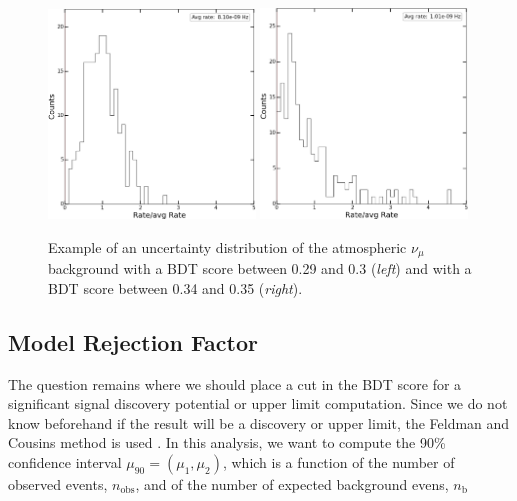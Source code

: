 \begin{figure}
\centering
\includegraphics[width=0.49\textwidth]{chapter8/img/PMF_test_numu_atmos_bg_betweenbin_0p29_0p3_crop_typo.png}
\includegraphics[width=0.49\textwidth]{chapter8/img/PMF_test_numu_atmos_bg_betweenbin_0p34_0p35_crop_typo.png}
\caption{Example of an uncertainty distribution of the atmospheric $\nu_\mu$ background with a BDT score between 0.29 and 0.3 (\textit{left}) and with a BDT score between 0.34 and 0.35 (\textit{right}).}
\label{fig:betweenbins}
\end{figure}


\subsection{Model Rejection Factor}
\label{subsec:mrf}
The question remains where we should place a cut in the BDT score for a significant signal discovery potential or upper limit computation. Since we do not know beforehand if the result will be a discovery or upper limit, the Feldman and Cousins method is used \cite{Feldman:1997qc}. In this analysis, we want to compute the 90\% confidence interval $\mu_{90} = (\mu_1, \mu_2)$, which is a function of the number of observed events, $n_\textrm{obs}$, and of the number of expected background evens, $n_\textrm{b}$

